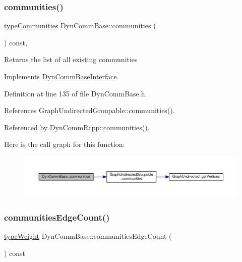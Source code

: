 \subsubsection{\texorpdfstring{communities()}{communities()}}
{\footnotesize\ttfamily \hyperlink{graphUndirectedGroupable_8h_ab79c7252155ca17cb49aa0b1fea30116}{type\+Communities} Dyn\+Comm\+Base\+::communities (\begin{DoxyParamCaption}{ }\end{DoxyParamCaption}) const\hspace{0.3cm}{\ttfamily [inline]}, {\ttfamily [virtual]}}

\begin{DoxyReturn}{Returns}
the list of all existing communities 
\end{DoxyReturn}


Implements \hyperlink{classDynCommBaseInterface_aedba7e43ae301ab910340f1d766d1698}{Dyn\+Comm\+Base\+Interface}.



Definition at line 135 of file Dyn\+Comm\+Base.\+h.



References Graph\+Undirected\+Groupable\+::communities().



Referenced by Dyn\+Comm\+Rcpp\+::communities().

Here is the call graph for this function\+:
\nopagebreak
\begin{figure}[H]
\begin{center}
\leavevmode
\includegraphics[width=350pt]{classDynCommBase_a064d9909a91cfe25acf05e6bd1fc967d_cgraph}
\end{center}
\end{figure}
\mbox{\label{classDynCommBase_af95d4ab7f1814514fd5961900731ba12}} 
\subsubsection{\texorpdfstring{communities\+Edge\+Count()}{communitiesEdgeCount()}}
{\footnotesize\ttfamily \hyperlink{edge_8h_a2e7ea3be891ac8b52f749ec73fee6dd2}{type\+Weight} Dyn\+Comm\+Base\+::communities\+Edge\+Count (\begin{DoxyParamCaption}{ }\end{DoxyParamCaption}) const\hspace{0.3cm}{\ttfamily [inline]}}

